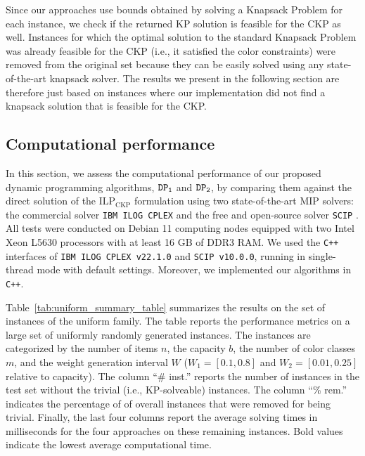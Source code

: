 \documentclass[preprint,11pt]{elsarticle}
\newcommand{\capacity}{b}
\newcommand{\formCKP}{\text{ILP}_\text{CKP}}
\newcommand{\firstDP}{{\tt DP_1}}
\newcommand{\secondDP}{{\tt DP_2}}
\theoremstyle{definition}
\begin{document}
Since our approaches use bounds obtained by solving a Knapsack Problem for each instance, we check if the returned KP solution is feasible for the CKP as well. Instances for which the optimal solution to the standard Knapsack Problem was already feasible for the CKP (i.e., it satisfied the color constraints) were removed from the original set because they can be easily solved using any state-of-the-art knapsack solver. The results we present in the following section are therefore just based on instances where our implementation did not find a knapsack solution that is feasible for the CKP.


\subsection{Computational performance}
\label{sec:performance}

In this section, we assess the computational performance of our proposed dynamic programming algorithms, $\firstDP$ and $\secondDP$, by comparing them against the direct solution of the $\formCKP$ formulation using two state-of-the-art MIP solvers: the commercial solver {\tt IBM ILOG CPLEX} \citep{cplex} and the free and open-source solver {\tt SCIP} \citep{SCIPOptSuite10}.
All tests were conducted on Debian 11 computing nodes equipped with two Intel Xeon L5630 processors with at least 16 GB of DDR3 RAM.
We used the \texttt{C++} interfaces of \texttt{IBM ILOG CPLEX v22.1.0} and \texttt{SCIP v10.0.0}, running in single-thread mode with default settings. Moreover, we implemented our algorithms in \texttt{C++}.

\medskip


Table~\ref{tab:uniform_summary_table} summarizes the results on the set of instances of the uniform family. The table reports the performance metrics on a large set of uniformly randomly generated instances. The instances are categorized by the number of items $n$, the capacity $\capacity$, the number of color classes $m$, and the weight generation interval $W$ ($W_1 = [0.1, 0.8]$ and $W_2 = [0.01, 0.25]$ relative to capacity).
The column ``\# inst.'' reports the number of instances in the test set without the trivial (i.e., KP-solveable) instances.
The column ``\% rem.'' indicates the percentage of of overall instances that were removed for being trivial.
Finally, the last four columns report the average solving times in milliseconds for the four approaches on these remaining instances. Bold values indicate the lowest average computational time.
\end{document}
